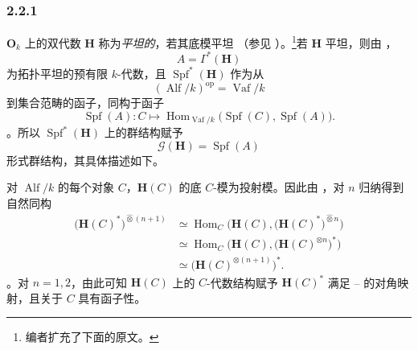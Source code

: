
\subsubsection*{2.2.1}
\label{sga3:VIIB:2.2.1}

\(\mathbf O_k\) 上的双代数 \(\mathbf H\) 称为\emph{平坦的}，若其底模平坦 \textup{（参见 ）}。\footnote{\label{sga3:VIIB:nde:79}编者扩充了下面的原文。}若 \(\mathbf H\) 平坦，则由 ，\[
  A=\Gamma^*(\mathbf H)
\] 为拓扑平坦的预有限 \(k\)-代数，且 \(\operatorname{Spf}^*(\mathbf H)\) 作为从 \[
  (\operatorname{Alf}/k)^{\mathrm{op}}
  =
  \operatorname{Vaf}/k
\] 到集合范畴的函子，同构于函子 \[
  \operatorname{Spf}(A):
  C\longmapsto
  \operatorname{Hom}_{\operatorname{Vaf}/k}
    \bigl(\operatorname{Spf}(C),\operatorname{Spf}(A)\bigr).
\]。所以 \(\operatorname{Spf}^*(\mathbf H)\) 上的群结构赋予 \[
  \mathscr G(\mathbf H)=\operatorname{Spf}(A)
\] 形式群结构，其具体描述如下。

对 \(\operatorname{Alf}/k\) 的每个对象 \(C\)，\(\mathbf H(C)\) 的底 \(C\)-模为投射模。因此由 ，对 \(n\) 归纳得到自然同构 \[
\begin{aligned}
  \bigl(\mathbf H(C)^*\bigr)^{\widehat\otimes(n+1)}
  &\simeq
  \operatorname{Hom}_C
    \bigl(
      \mathbf H(C),
      \bigl(\mathbf H(C)^*\bigr)^{\widehat\otimes n}
    \bigr)
  \\
  &\simeq
  \operatorname{Hom}_C
    \bigl(
      \mathbf H(C),
      \bigl(\mathbf H(C)^{\otimes n}\bigr)^*
    \bigr)
  \\
  &\simeq
  \bigl(\mathbf H(C)^{\otimes(n+1)}\bigr)^*.
\end{aligned}
\]。对 \(n=1,2\)，由此可知 \(\mathbf H(C)\) 上的 \(C\)-代数结构赋予 \(\mathbf H(C)^*\) 满足 \textup{}--\textup{} 的对角映射，且关于 \(C\) 具有函子性。

